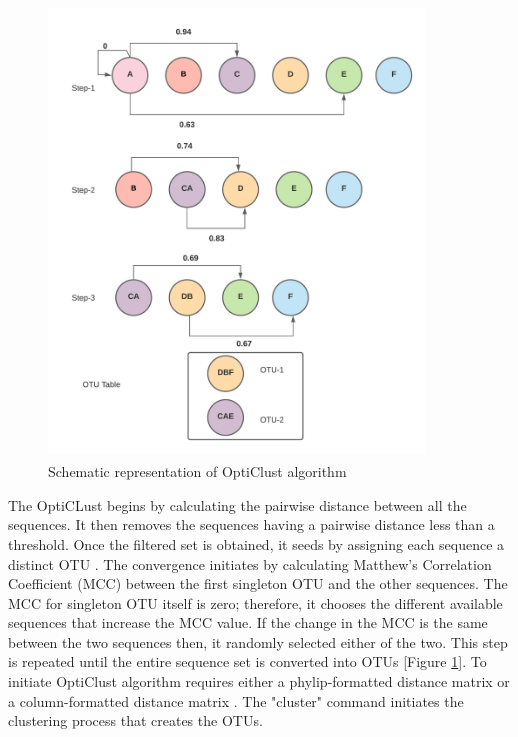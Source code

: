 \begin{figure}[!hb]
  \centering
  \includegraphics[width=10cm, height=12cm]{../figures/Figure5.png}
  \caption{Schematic representation of OptiClust algorithm}
  \label{fig:figure5}
\end{figure}

The OptiCLust begins by calculating the pairwise distance between all the sequences. It then removes the sequences having a pairwise distance less than a threshold. Once the filtered set is obtained, it seeds by assigning each sequence a distinct OTU \cite{ref18}. The convergence initiates by calculating Matthew's Correlation Coefficient (MCC) between the first singleton OTU and the other sequences. The MCC for singleton OTU itself is zero; therefore, it chooses the different available sequences that increase the MCC value. If the change in the MCC is the same between the two sequences then, it randomly selected either of the two. This step is repeated until the entire sequence set is converted into OTUs [Figure \ref{fig:figure5}]. To initiate OptiClust algorithm requires either a phylip-formatted distance matrix or a column-formatted distance matrix \cite{ref18}. The "cluster" command initiates the clustering process that creates the OTUs.